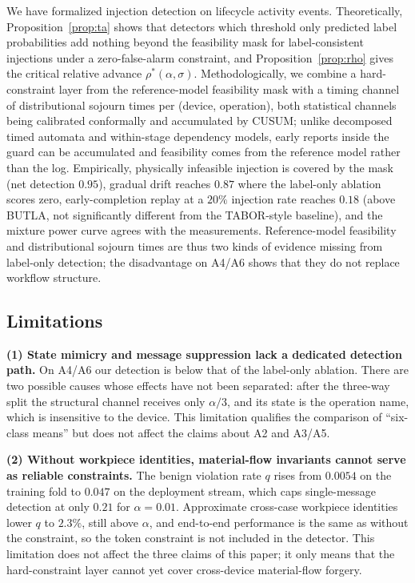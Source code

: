 \documentclass[manuscript,screen,review]{acmart}
\begin{document}
We have formalized injection detection on lifecycle activity events. Theoretically, Proposition~\ref{prop:ta} shows that detectors which threshold only predicted label probabilities add nothing beyond the feasibility mask for label-consistent injections under a zero-false-alarm constraint, and Proposition~\ref{prop:rho} gives the critical relative advance $\rho^*(\alpha,\sigma)$. Methodologically, we combine a hard-constraint layer from the reference-model feasibility mask with a timing channel of distributional sojourn times per (device, operation), both statistical channels being calibrated conformally and accumulated by {CUSUM}; unlike decomposed timed automata and within-stage dependency models, early reports inside the guard can be accumulated and feasibility comes from the reference model rather than the log. Empirically, physically infeasible injection is covered by the mask (net detection $0.95$), gradual drift reaches $0.87$ where the label-only ablation scores zero, early-completion replay at a $20\%$ injection rate reaches $0.18$ (above {BUTLA}, not significantly different from the {TABOR}-style baseline), and the mixture power curve agrees with the measurements. Reference-model feasibility and distributional sojourn times are thus two kinds of evidence missing from label-only detection; the disadvantage on {A4}/{A6} shows that they do not replace workflow structure.

\subsection{Limitations}
\label{sec:limitations}

\textbf{(1) State mimicry and message suppression lack a dedicated detection path.}
On {A4}/{A6} our detection is below that of the label-only ablation. There are two possible causes whose effects have not been separated: after the three-way split the structural channel receives only $\alpha/3$, and its state is the operation name, which is insensitive to the device. This limitation qualifies the comparison of ``six-class means'' but does not affect the claims about {A2} and {A3}/{A5}.

\textbf{(2) Without workpiece identities, material-flow invariants cannot serve as reliable constraints.}
The benign violation rate $q$ rises from $0.0054$ on the training fold to $0.047$ on the deployment stream, which caps single-message detection at only $0.21$ for $\alpha=0.01$. Approximate cross-case workpiece identities lower $q$ to $2.3\%$, still above $\alpha$, and end-to-end performance is the same as without the constraint, so the token constraint is not included in the detector. This limitation does not affect the three claims of this paper; it only means that the hard-constraint layer cannot yet cover cross-device material-flow forgery.
\end{document}
